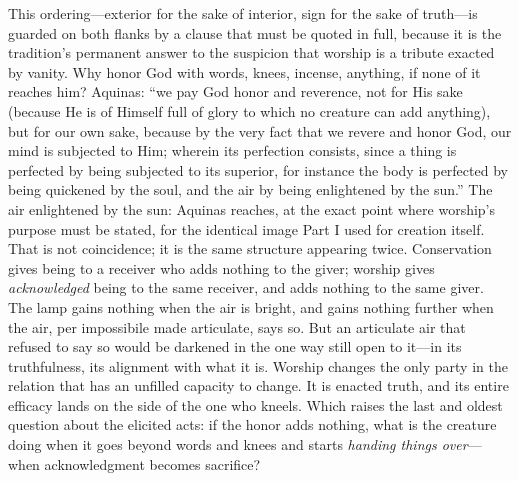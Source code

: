 This ordering---exterior for the sake of interior, sign for the sake of truth---is guarded on both flanks by a clause that must be quoted in full, because it is the tradition's permanent answer to the suspicion that worship is a tribute exacted by vanity. Why honor God with words, knees, incense, anything, if none of it reaches him? Aquinas: ``we pay God honor and reverence, not for His sake (because He is of Himself full of glory to which no creature can add anything), but for our own sake, because by the very fact that we revere and honor God, our mind is subjected to Him; wherein its perfection consists, since a thing is perfected by being subjected to its superior, for instance the body is perfected by being quickened by the soul, and the air by being enlightened by the sun.'' The air enlightened by the sun: Aquinas reaches, at the exact point where worship's purpose must be stated, for the identical image Part I used for creation itself. That is not coincidence; it is the same structure appearing twice. Conservation gives being to a receiver who adds nothing to the giver; worship gives \emph{acknowledged} being to the same receiver, and adds nothing to the same giver. The lamp gains nothing when the air is bright, and gains nothing further when the air, per impossibile made articulate, says so. But an articulate air that refused to say so would be darkened in the one way still open to it---in its truthfulness, its alignment with what it is. Worship changes the only party in the relation that has an unfilled capacity to change. It is enacted truth, and its entire efficacy lands on the side of the one who kneels. Which raises the last and oldest question about the elicited acts: if the honor adds nothing, what is the creature doing when it goes beyond words and knees and starts \emph{handing things over}---when acknowledgment becomes sacrifice?
